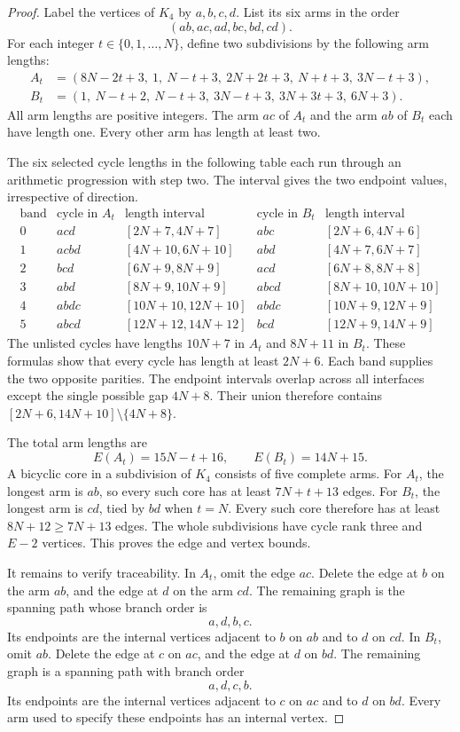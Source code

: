 \begin{proof}
Label the vertices of $K_4$ by $a,b,c,d$.
List its six arms in the order
\[
 (ab,ac,ad,bc,bd,cd).
\]
For each integer $t\in\{0,1,\ldots,N\}$, define two subdivisions by the following arm lengths:
\begin{align*}
 A_t&=(8N-2t+3,\ 1,\ N-t+3,\ 2N+2t+3,\ N+t+3,\ 3N-t+3),\\
 B_t&=(1,\ N-t+2,\ N-t+3,\ 3N-t+3,\ 3N+3t+3,\ 6N+3).
\end{align*}
All arm lengths are positive integers.
The arm $ac$ of $A_t$ and the arm $ab$ of $B_t$ each have length one.
Every other arm has length at least two.

The six selected cycle lengths in the following table each run through an arithmetic progression with step two.
The interval gives the two endpoint values, irrespective of direction.
\[
\begin{array}{c|cc|cc}
 \text{band}&\text{cycle in }A_t&\text{length interval}&
              \text{cycle in }B_t&\text{length interval}\\\hline
 0&acd&[2N+7,4N+7]&abc&[2N+6,4N+6]\\
 1&acbd&[4N+10,6N+10]&abd&[4N+7,6N+7]\\
 2&bcd&[6N+9,8N+9]&acd&[6N+8,8N+8]\\
 3&abd&[8N+9,10N+9]&abcd&[8N+10,10N+10]\\
 4&abdc&[10N+10,12N+10]&abdc&[10N+9,12N+9]\\
 5&abcd&[12N+12,14N+12]&bcd&[12N+9,14N+9]
\end{array}
\]
The unlisted cycles have lengths $10N+7$ in $A_t$ and $8N+11$ in $B_t$.
These formulas show that every cycle has length at least $2N+6$.
Each band supplies the two opposite parities.
The endpoint intervals overlap across all interfaces except the single possible gap $4N+8$.
Their union therefore contains $[2N+6,14N+10]\setminus\{4N+8\}$.

The total arm lengths are
\[
 E(A_t)=15N-t+16,\qquad E(B_t)=14N+15.
\]
A bicyclic core in a subdivision of $K_4$ consists of five complete arms.
For $A_t$, the longest arm is $ab$, so every such core has at least $7N+t+13$ edges.
For $B_t$, the longest arm is $cd$, tied by $bd$ when $t=N$.
Every such core therefore has at least $8N+12\ge7N+13$ edges.
The whole subdivisions have cycle rank three and $E-2$ vertices.
This proves the edge and vertex bounds.

It remains to verify traceability.
In $A_t$, omit the edge $ac$.
Delete the edge at $b$ on the arm $ab$, and the edge at $d$ on the arm $cd$.
The remaining graph is the spanning path whose branch order is
\[
 a,d,b,c.
\]
Its endpoints are the internal vertices adjacent to $b$ on $ab$ and to $d$ on $cd$.
In $B_t$, omit $ab$.
Delete the edge at $c$ on $ac$, and the edge at $d$ on $bd$.
The remaining graph is a spanning path with branch order
\[
 a,d,c,b.
\]
Its endpoints are the internal vertices adjacent to $c$ on $ac$ and to $d$ on $bd$.
Every arm used to specify these endpoints has an internal vertex.


\end{proof}
